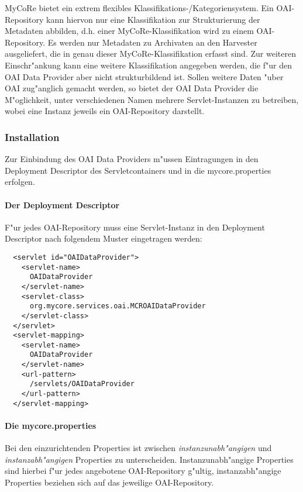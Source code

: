 MyCoRe bietet ein extrem flexibles Klassifikations-/Kategoriensystem. Ein OAI-Repository kann hiervon nur eine Klassifikation zur Strukturierung der Metadaten abbilden, d.h. einer MyCoRe-Klassifikation wird zu einem OAI-Repository. Es werden nur
Metadaten zu Archivaten an den Harvester ausgeliefert, die in genau dieser MyCoRe-Klassifikation erfasst sind.
Zur weiteren Einschr"ankung kann eine weitere Klassifikation angegeben werden, die f"ur den OAI Data Provider aber nicht
strukturbildend ist.\linebreak
Sollen weitere Daten "uber OAI zug"anglich gemacht werden, so bietet der OAI Data Provider die M"oglichkeit, unter verschiedenen Namen mehrere Servlet-Instanzen zu betreiben, wobei eine Instanz jeweils ein OAI-Repository darstellt.

\subsubsection*{Installation}

Zur Einbindung des OAI Data Providers m"ussen Eintragungen in den Deployment Descriptor des Servletcontainers und 
in die mycore.properties erfolgen.

\paragraph*{Der Deployment Descriptor}

F"ur jedes OAI-Repository muss eine Servlet-Instanz in den Deployment Descriptor nach folgendem Muster eingetragen werden:

\begin{verbatim}
  <servlet id="OAIDataProvider">
    <servlet-name>
      OAIDataProvider
    </servlet-name>
    <servlet-class>
      org.mycore.services.oai.MCROAIDataProvider
    </servlet-class>
  </servlet>
  <servlet-mapping>
    <servlet-name>
      OAIDataProvider
    </servlet-name>
    <url-pattern>
      /servlets/OAIDataProvider
    </url-pattern>
  </servlet-mapping>
\end{verbatim}

\paragraph*{Die mycore.properties}

Bei den einzurichtenden Properties ist zwischen \textsl{instanzunabh"angigen} und \textsl{instanzabh"angigen} Properties
zu unterscheiden. Instanzunabh"angige Properties sind hierbei f"ur jedes angebotene OAI-Repository g"ultig, instanzabh"angige
Properties beziehen sich auf das jeweilige OAI-Repository.

